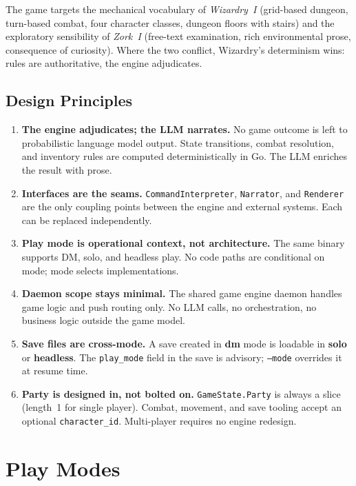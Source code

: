\documentclass[a4paper,10pt]{article}
\newcommand{\iface}[1]{\texttt{#1}}
\newcommand{\cmd}[1]{\texttt{#1}}
\newcommand{\field}[1]{\texttt{#1}}
\newcommand{\mode}[1]{\textbf{#1}}
\begin{document}
The game targets the mechanical vocabulary of \emph{Wizardry~I}
(grid-based dungeon, turn-based combat, four character classes,
dungeon floors with stairs) and the exploratory sensibility of
\emph{Zork~I} (free-text examination, rich environmental prose,
consequence of curiosity).  Where the two conflict, Wizardry's
determinism wins: rules are authoritative, the engine adjudicates.

\subsection{Design Principles}

\begin{enumerate}[label=\textbf{P\arabic*}.]
  \item \textbf{The engine adjudicates; the LLM narrates.}
    No game outcome is left to probabilistic language model output.
    State transitions, combat resolution, and inventory rules are
    computed deterministically in Go.  The LLM enriches the result
    with prose.
  \item \textbf{Interfaces are the seams.}
    \iface{CommandInterpreter}, \iface{Narrator}, and
    \iface{Renderer} are the only coupling points between the engine
    and external systems.  Each can be replaced independently.
  \item \textbf{Play mode is operational context, not architecture.}
    The same binary supports DM, solo, and headless play.  No code
    paths are conditional on mode; mode selects implementations.
  \item \textbf{Daemon scope stays minimal.}
    The shared game engine daemon handles game logic and push
    routing only.  No LLM calls, no orchestration, no business
    logic outside the game model.
  \item \textbf{Save files are cross-mode.}
    A save created in \mode{dm} mode is loadable in \mode{solo} or
    \mode{headless}.  The \field{play\_mode} field in the save is
    advisory; \cmd{--mode} overrides it at resume time.
  \item \textbf{Party is designed in, not bolted on.}
    \texttt{GameState.Party} is always a slice (length~1 for single
    player).  Combat, movement, and save tooling accept an optional
    \field{character\_id}.  Multi-player requires no
    engine redesign.
\end{enumerate}

\section{Play Modes}
\end{document}
